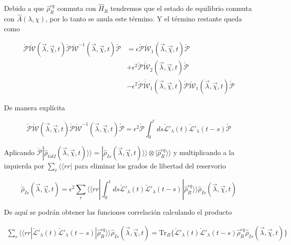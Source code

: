 \begin{appendixs}
Debido a que $\hat{\rho}^{eq}_{R}$ conmuta con $\hat{H}_{R}$ tendremos que el estado de equilibrio conmuta con $\hat{A}(\lambda,\chi)$, por lo tanto se anula este término. Y el término restante queda como 

\begin{align*}
    \check{\mathcal{P}}\dot{\check{\mathcal{W}}}(\vec{\lambda},\vec{\chi},t)\check{\mathcal{P}}\check{\mathcal{W}}^{-1}(\vec{\lambda},\vec{\chi},t)\check{\mathcal{P}} & = \epsilon \check{\mathcal{P}}\dot{\check{\mathcal{W}}}_{1}(\vec{\lambda},\vec{\chi},t)\check{\mathcal{P}} \\
    & + \epsilon^{2}\check{\mathcal{P}}\dot{\check{\mathcal{W}}}_{2}(\vec{\lambda},\vec{\chi},t)\check{\mathcal{P}} \\
    & - \epsilon^{2}\check{\mathcal{P}}\dot{\check{\mathcal{W}}}_{1}(\vec{\lambda},\vec{\chi},t)\check{\mathcal{P}}  \check{\mathcal{W}}_{1}(\vec{\lambda},\vec{\chi},t) \check{\mathcal{P}}
\end{align*}

De manera explícita

\begin{equation*}
    \check{\mathcal{P}}\dot{\check{\mathcal{W}}}(\vec{\lambda},\vec{\chi},t)\check{\mathcal{P}}\check{\mathcal{W}}^{-1}(\vec{\lambda},\vec{\chi},t)\check{\mathcal{P}} = \epsilon^{2}\check{\mathcal{P}}\int_{0}^{t}ds \check{\mathcal{L}}'_{\lambda}(t)\check{\mathcal{L}}'_{\lambda}(t-s)\check{\mathcal{P}} 
\end{equation*}

Aplicando $\check{\mathcal{P}}|\dot{\hat{\rho}}_{totI}(\vec{\lambda},\vec{\chi},t)\rangle \rangle = |\dot{\hat{\rho}}_{Is}(\vec{\lambda},\vec{\chi},t)\rangle \rangle \otimes |\hat{\rho}^{eq}_{R}\rangle \rangle$ y multiplicando a la izquierda por $\sum_{r}\langle \langle rr|$ para eliminar los grados de libertad del reservorio

\begin{equation*}
    \dot{\hat{\rho}}_{Is}(\vec{\lambda},\vec{\chi},t) = \epsilon^{2} \sum_{r}\langle \langle rr|\int_{0}^{t}ds \check{\mathcal{L}}'_{\lambda}(t)\check{\mathcal{L}}'_{\lambda}(t-s)|\hat{\rho}_{R}^{eq}\rangle \rangle \hat{\rho}_{Is}(\vec{\lambda},\vec{\chi},t)
\end{equation*}

De aquí se podrán obtener las funciones correlación calculando el producto

\begin{align*}
    \sum_{r}\langle \langle rr| \check{\mathcal{L}}'_{\lambda}(t)\check{\mathcal{L}}'_{\lambda}(t-s)|\hat{\rho}_{R}^{eq}\rangle \rangle \hat{\rho}_{Is}(\vec{\lambda},\vec{\chi},t) = \text{Tr}_{B}\{\check{\mathcal{L}}'_{\lambda}(t)\check{\mathcal{L}}'_{\lambda}(t-s)\hat{\rho}_{R}^{eq}\hat{\rho}_{Is}(\vec{\lambda},\vec{\chi},t) \}
\end{align*}


\end{appendixs}
